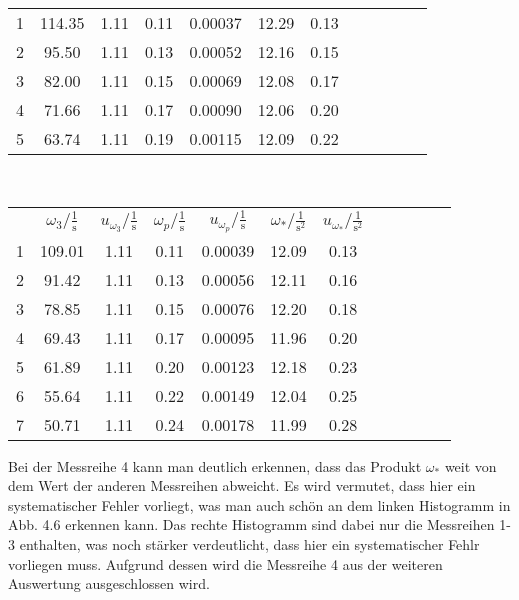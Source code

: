 \begin{center}
\begin{tabular}{gccccccccccc}
        1 &  114.35 &  1.11 &  0.11 &  0.00037 &  12.29 &  0.13 \\
        2 &   95.50 &  1.11 &  0.13 &  0.00052 &  12.16 &  0.15 \\
        3 &   82.00 &  1.11 &  0.15 &  0.00069 &  12.08 &  0.17 \\
        4 &   71.66 &  1.11 &  0.17 &  0.00090 &  12.06 &  0.20 \\
        5 &   63.74 &  1.11 &  0.19 &  0.00115 &  12.09 &  0.22 \\
    \end{tabular}\\
    \newpage
    \begin{tabular}{gccccccccccc}
         &      $\omega_3/\frac{1}{\text{s}}$ &  $u_{\omega_3}/\frac{1}{\text{s}}$ &    $\omega_p/\frac{1}{\text{s}}$ &     $u_{\omega_p}/\frac{1}{\text{s}}$ &     $\omega_*/\frac{1}{\text{s}^2}$&  $u_{\omega_*}/\frac{1}{\text{s}^2}$\\
        1 &  109.01 &  1.11 &  0.11 &  0.00039 &  12.09 &  0.13 \\
        2 &   91.42 &  1.11 &  0.13 &  0.00056 &  12.11 &  0.16 \\
        3 &   78.85 &  1.11 &  0.15 &  0.00076 &  12.20 &  0.18 \\
        4 &   69.43 &  1.11 &  0.17 &  0.00095 &  11.96 &  0.20 \\
        5 &   61.89 &  1.11 &  0.20 &  0.00123 &  12.18 &  0.23 \\
        6 &   55.64 &  1.11 &  0.22 &  0.00149 &  12.04 &  0.25 \\
        7 &   50.71 &  1.11 &  0.24 &  0.00178 &  11.99 &  0.28 \\
    \end{tabular}
\end{center}
Bei der Messreihe 4 kann man deutlich erkennen, dass das Produkt $\omega_*$ weit von dem Wert der anderen Messreihen abweicht. Es wird vermutet, dass hier ein systematischer Fehler vorliegt, was man auch schön an dem linken Histogramm in Abb. 4.6 erkennen kann. Das rechte Histogramm sind dabei nur die Messreihen 1-3 enthalten, was noch stärker verdeutlicht, dass hier ein systematischer Fehlr vorliegen muss. Aufgrund dessen wird die Messreihe 4 aus der weiteren Auswertung ausgeschlossen wird. 
